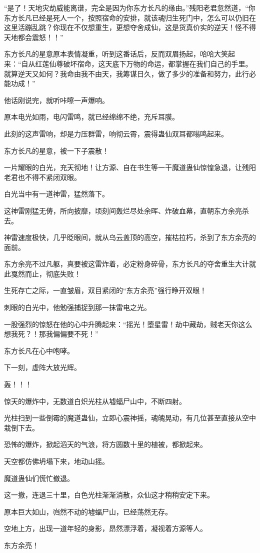 \begin{this_body}
“是了！天地灾劫威能离谱，完全是因为你东方长凡的缘由。”残阳老君忽然道，“你东方长凡已经是死人一个，按照宿命的安排，就该魂归生死门中，怎么可以仍旧在这里活蹦乱跳？你现在不仅想重生，更想夺舍成仙，这是货真价实的逆天！怪不得天地都会震怒！！”

东方长凡的星意原本表情凝重，听到这番话后，反而双眉扬起，哈哈大笑起来：“自从红莲仙尊破坏宿命，这天底下万物的命运，都掌握在我们自己的手里。就算逆天又如何？我命由我不由天，我筹谋日久，做了多少的准备和努力，此行必能功成！”

他话刚说完，就听咔嚓一声爆响。

原本电光如雨，电闪雷鸣，就已经绵绵不绝，充斥耳膜。

此刻的这声雷响，却是力压群雷，响彻云霄，震得蛊仙双耳都嗡鸣起来。

东方长凡的星意，被一下子震散！

一片耀眼的白光，充天彻地！让方源、自在书生等一干魔道蛊仙惊惶急退，让残阳老君也不得不紧闭双眼。

白光当中有一道神雷，猛然落下。

这神雷刚猛无俦，所向披靡，顷刻间轰烂尽处余晖、炸破血幕，直朝东方余亮杀去。

神雷速度极快，几乎眨眼间，就从乌云盖顶的高空，摧枯拉朽，杀到了东方余亮的面前。

东方余亮不过凡躯，真要被这雷炸着，必定粉身碎骨，东方长凡的夺舍重生大计就此戛然而止，彻底失败！

生死存亡之际，一直皱眉，双目紧闭的“东方余亮”强行睁开双眼！

刺眼的白光中，他勉强捕捉到那一抹雷电之光。

一股强烈的惊怒在他的心中升腾起来：“摇光！堕星雷！劫中藏劫，贼老天你这么想我死？！那我偏偏要不死！”

东方长凡在心中咆哮。

下一刻，虚阵大放光辉。

轰！！！

惊天的爆炸中，无数道白炽光柱从墟蝠尸山中，不断四射。

光柱扫到一些倒霉的魔道蛊仙，立即心震神摇，魂魄晃动，有几位甚至直接从空中栽倒下去。

恐怖的爆炸，掀起滔天的气浪，将方圆数十里的植被，都掀起来。

天空都仿佛坍塌下来，地动山摇。

魔道蛊仙们慌忙撤退。

这一撤，连退三十里，白色光柱渐渐消散，众仙这才稍稍安定下来。

原本巨大如山，岿然不动的墟蝠尸山，已经荡然无存。

空地上方，出现一道年轻的身影，昂然漂浮着，凝视着方源等人。

东方余亮！

\end{this_body}

